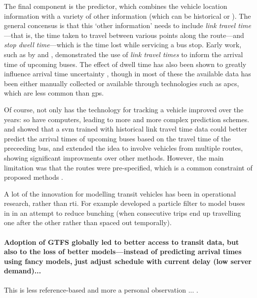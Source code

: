 The final component is the predictor, which combines the vehicle location information with a variety of other information (which can be historical or \rt{}). The general concensus is that this `other information' needs to include \emph{link travel time}---that is, the time taken to travel between various points along the route---and \emph{stop dwell time}---which is the time lost while servicing a bus stop. Early work, such as by \citet{Reinhoudt_1997} and \citet{Wall_1999}, demonstrated the use of \emph{link travel times} to inform the arrival time of upcoming buses. The effect of dwell time has also been shown to greatly influence arrival time uncertainty \citep{Jeong_2005,Meng_2013,Shen_2013,Robinson_2013,Gong_2013,Wang_2016}, though in most of these the available data has been either manually collected or available through technologies such as \glspl{apc}, which are less common than \gls{gps}.



Of course, not only has the technology for tracking a vehicle improved over the years: so have computers, leading to more and more complex prediction schemes.  and \citet{Yu_2010} showed that a \gls{svm} trained with historical link travel time data could better predict the arrival times of upcoming buses based on the travel time of the preceeding bus, and \citet{Yu_2011} extended the idea to involve vehicles from multiple routes, showing significant improvments over other methods. However, the main limitation was that the routes were pre-specified, which is a common constraint of proposed methods \citep{Chang_2010,Celan_2017,Celan_2018}.


A lot of the innovation for modelling transit vehicles has been in operational research, rather than \gls{rti}. For example \citet{Hans_2015} developed a particle filter to model buses in \rt{} in an attempt to reduce bunching (when consecutive trips end up travelling one after the other rather than spaced out temporally).



\paragraph{Adoption of GTFS globally led to better access to transit data, but also to the loss of better models---instead of predicting arrival times using fancy models, just adjust schedule with current delay (low server demand)...}
This is less reference-based and more a personal observation ...
\citet{TCRP_2020}.


